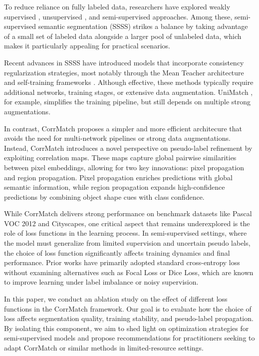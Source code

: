 \documentclass[10pt,twocolumn,letterpaper]{article}
\begin{document}
To reduce reliance on fully labeled data, researchers have explored weakly supervised \cite{jiang2021online, jiang2022l2g, wang2020self}, unsupervised \cite{gao2022large,hwang2019segsort, harb2021infoseg}, and semi-supervised  \cite{hu2021semi, hong2015decoupled, french2019semi } approaches. Among these, semi-supervised semantic segmentation (SSSS) strikes a balance by taking advantage of a small set of labeled data alongside a larger pool of unlabeled data, which makes it particularly appealing for practical scenarios.

Recent advances in SSSS have introduced models that incorporate consistency regularization strategies, most notably through the Mean Teacher architecture \cite{hu2021semi, jin2022semi } and self-training frameworks \cite{xu2022semi, ke2022three}. Although effective, these methods typically require additional networks, training stages, or extensive data augmentation. UniMatch \cite{yang2023revisiting}, for example, simplifies the training pipeline, but still depends on multiple strong augmentations.

In contrast, CorrMatch proposes a simpler and more efficient architecure that avoids the need for multi-network pipelines or strong data augmentations. Instead, CorrMatch introduces a novel perspective on pseudo-label refinement by exploiting correlation maps. These maps capture global pairwise similarities between pixel embeddings, allowing for two key innovations: pixel propagation and region propagation. Pixel propagation enriches predictions with global semantic information, while region propagation expands high-confidence predictions by combining object shape cues with class confidence.

While CorrMatch delivers strong performance on benchmark datasets like Pascal VOC 2012 and Cityscapes, one critical aspect that remains underexplored is the role of loss functions in the learning process. In semi-supervised settings, where the model must generalize from limited supervision and uncertain pseudo labels, the choice of loss function significantly affects training dynamics and final performance. Prior works have primarily adopted standard cross-entropy loss without examining alternatives such as Focal Loss or Dice Loss, which are known to improve learning under label imbalance or noisy supervision.

In this paper, we conduct an ablation study on the effect of different loss functions in the CorrMatch framework. Our goal is to evaluate how the choice of loss affects segmentation quality, training stability, and pseudo-label propagation. By isolating this component, we aim to shed light on optimization strategies for semi-supervised models and propose recommendations for practitioners seeking to adapt CorrMatch or similar methods in limited-resource settings.
\end{document}
